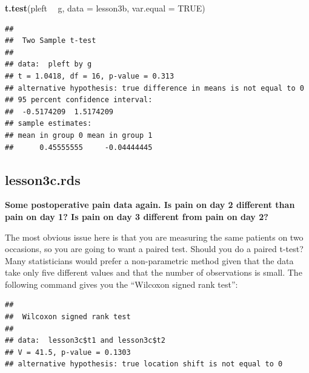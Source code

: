 \documentclass[]{book}
\newenvironment{Shaded}{\begin{snugshade}}{\end{snugshade}}
\newcommand{\DataTypeTok}[1]{\textcolor[rgb]{0.13,0.29,0.53}{#1}}
\newcommand{\KeywordTok}[1]{\textcolor[rgb]{0.13,0.29,0.53}{\textbf{#1}}}
\newcommand{\NormalTok}[1]{#1}
\newcommand{\OperatorTok}[1]{\textcolor[rgb]{0.81,0.36,0.00}{\textbf{#1}}}
\newcommand{\OtherTok}[1]{\textcolor[rgb]{0.56,0.35,0.01}{#1}}
\newcommand{\StringTok}[1]{\textcolor[rgb]{0.31,0.60,0.02}{#1}}
\begin{document}
\begin{Shaded}
\begin{Highlighting}[]
\KeywordTok{t.test}\NormalTok{(pleft }\OperatorTok{~}\StringTok{ }\NormalTok{g, }\DataTypeTok{data =}\NormalTok{ lesson3b, }\DataTypeTok{var.equal =} \OtherTok{TRUE}\NormalTok{)}
\end{Highlighting}
\end{Shaded}

\begin{verbatim}
## 
##  Two Sample t-test
## 
## data:  pleft by g
## t = 1.0418, df = 16, p-value = 0.313
## alternative hypothesis: true difference in means is not equal to 0
## 95 percent confidence interval:
##  -0.5174209  1.5174209
## sample estimates:
## mean in group 0 mean in group 1 
##      0.45555555     -0.04444445
\end{verbatim}

\hypertarget{lesson3c.rds}{%
\subsection{lesson3c.rds}\label{lesson3c.rds}}

\textbf{Some postoperative pain data again. Is pain on day 2 different than pain on day 1? Is pain on day 3 different from pain on day 2?}

The most obvious issue here is that you are measuring the same patients on two occasions, so you are going to want a paired test. Should you do a paired t-test? Many statisticians would prefer a non-parametric method given that the data take only five different values and that the number of observations is small. The following command gives you the ``Wilcoxon signed rank test'':

\begin{Shaded}
\end{Shaded}

\begin{verbatim}
## 
##  Wilcoxon signed rank test
## 
## data:  lesson3c$t1 and lesson3c$t2
## V = 41.5, p-value = 0.1303
## alternative hypothesis: true location shift is not equal to 0
\end{verbatim}
\end{document}
